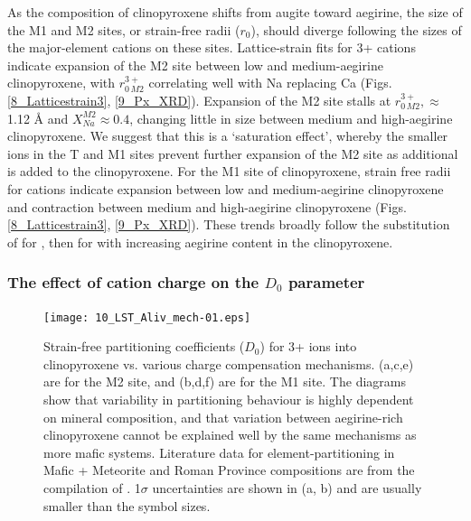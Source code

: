 \documentclass[review,authoryear,12pt]{elsarticle}
\begin{document}
	As the composition of clinopyroxene shifts from augite toward aegirine, the size of the M1 and M2 sites, or strain-free radii ($r_0$), should diverge following the sizes of the major-element cations on these sites.
	Lattice-strain fits for 3+ cations indicate expansion of the M2 site between low and medium-aegirine clinopyroxene, with $r_{0\, M2}^{3+}$ correlating well with Na replacing Ca (Figs. \ref{8_Latticestrain3}, \ref{9_Px_XRD}). Expansion of the M2 site stalls at $r_{0\, M2}^{3+}, \approx$ 1.12 \si{\angstrom}{} and $X_{Na}^{M2} \approx 0.4$, changing little in size between medium and high-aegirine clinopyroxene. We suggest that this is a `saturation effect', whereby the smaller ions in the T and M1 sites prevent further expansion of the M2 site as additional  is added to the clinopyroxene. 	
	For the M1 site of clinopyroxene, strain free radii for  cations indicate expansion between low and medium-aegirine clinopyroxene and contraction between medium and high-aegirine clinopyroxene (Figs. \ref{8_Latticestrain3}, \ref{9_Px_XRD}). These trends broadly follow the substitution of  for , then  for  with increasing aegirine content in the clinopyroxene.
	


\subsubsection{The effect of cation charge on the $D_0$ parameter}
 \begin{figure}[tp]
        \begin{center}
        \texttt{[image: 10\_LST\_Aliv\_mech-01.eps]}
        
        \caption[Strain-free partition coefficients ($D_0$) for 3+ ions into clinopyroxene vs. various charge compensation mechanisms.]{Strain-free partitioning coefficients ($D_0$) for 3+ ions into clinopyroxene vs. various charge compensation mechanisms. (a,c,e) are for the M2 site, and (b,d,f) are for the M1 site. The diagrams show that variability in partitioning behaviour is highly dependent on mineral composition, and that variation between aegirine-rich clinopyroxene cannot be explained well by the same mechanisms as more mafic systems. Literature data for element-partitioning in Mafic + Meteorite and Roman Province compositions are from the compilation of \citet{Bedard2014}. 1$\sigma$ uncertainties are shown in (a, b) and are usually smaller than the symbol sizes.}
        \label{10_D0_Mech}
        \end{center}
        \end{figure}
\end{document}
